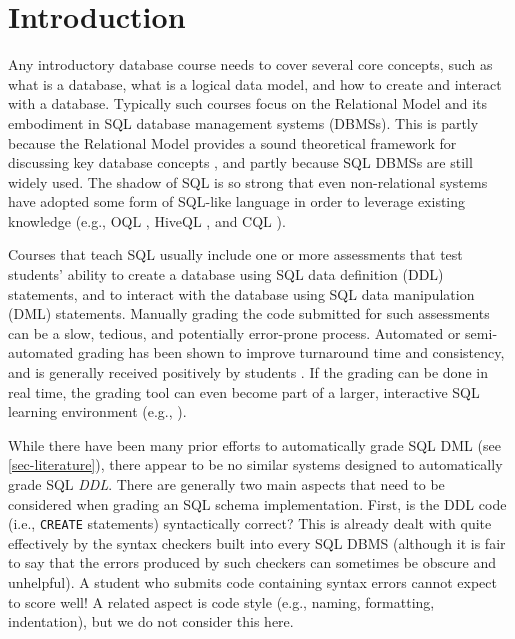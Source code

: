 \documentclass[sigconf, authordraft, capitalise]{acmart}
\begin{document}

\maketitle


\section{Introduction}

Any introductory database course needs to cover several core concepts, such as what is a database, what is a logical data model, and how to create and interact with a database. Typically such courses focus on the Relational Model and its embodiment in SQL database management systems (DBMSs). This is partly because the Relational Model provides a sound theoretical framework for discussing key database concepts \cite{Date.C-2009a-SQL-and-Relational}, and partly because SQL DBMSs are still widely used. The shadow of SQL is so strong that even non-relational systems have adopted some form of SQL-like language in order to leverage existing knowledge (e.g., OQL \cite{Cattell.R-2000a-ODMG3}, HiveQL \cite{Apache-2017a-Hive}, and CQL \cite{Apache-2017a-CQL}).

Courses that teach SQL usually include one or more assessments that test students' ability to create a database using SQL data definition (DDL) statements, and to interact with the database using SQL data manipulation (DML) statements. Manually grading the code submitted for such assessments can be a slow, tedious, and potentially error-prone process. Automated or semi-automated grading has been shown to improve turnaround time and consistency, and is generally received positively by students \cite{Douce.C-2005a-Automatic,Russell.G-2004a-Improving,Dekeyser.S-2007a-Computer,Prior.J-2004a-Backwash}. If the grading can be done in real time, the grading tool can even become part of a larger, interactive SQL learning environment (e.g.,  \cite{Kenny.C-2005a-Automated,Kleiner.C-2013a-Automated,Mitrovic.A-1998a-Learning,Russell.G-2004a-Improving,Sadiq.S-2004a-SQLator}).

While there have been many prior efforts to automatically grade SQL DML (see \cref{sec-literature}), there appear to be no similar systems designed to automatically grade SQL \emph{DDL}. There are generally two main aspects that need to be considered when grading an SQL schema implementation. First, is the DDL code (i.e., \texttt{CREATE} statements) syntactically correct? This is already dealt with quite effectively by the syntax checkers built into every SQL DBMS (although it is fair to say that the errors produced by such checkers can sometimes be obscure and unhelpful). A student who submits code containing syntax errors cannot expect to score well! A related aspect is code style (e.g., naming, formatting, indentation), but we do not consider this here.
    
\end{document}
